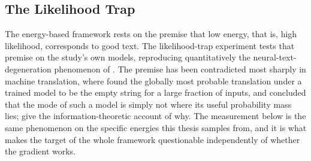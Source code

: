 


\subsection{The Likelihood Trap}
\label{sec:results-trap}

The energy-based framework rests on the premise that low energy, that is, high likelihood, corresponds to good text. The likelihood-trap experiment tests that premise on the study's own models, reproducing quantitatively the neural-text-degeneration phenomenon of \citet{holtzman2020curious}. The premise has been contradicted most sharply in machine translation, where \citet{stahlberg2019nmt} found the globally most probable translation under a trained model to be the empty string for a large fraction of inputs, and \citet{eikema2020map} concluded that the mode of such a model is simply not where its useful probability mass lies; \citet{meister2023locally} give the information-theoretic account of why. The measurement below is the same phenomenon on the specific energies this thesis samples from, and it is what makes the target of the whole framework questionable independently of whether the gradient works.

